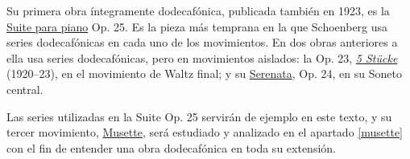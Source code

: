 Su primera obra íntegramente dodecafónica, publicada también en 1923, es la \href{https://www.youtube.com/watch?v=bQHR_Z8XVvI}{Suite para piano} Op. 25. Es la pieza más temprana en la que Schoenberg usa series dodecafónicas en cada uno de los movimientos. En dos obras anteriores a ella usa series dodecafónicas, pero en movimientos aislados: la Op. 23, \href{https://www.youtube.com/watch?v=7A9HSlgDlQE}{\emph{5 St\"ucke}} (1920--23), en el movimiento de Waltz final; y su \href{https://www.youtube.com/watch?v=fzAFalLbXxg}{Serenata}, Op. 24, en su Soneto central.

Las series utilizadas en la Suite Op. 25 servirán de ejemplo en este texto, y su tercer movimiento, \href{https://www.youtube.com/watch?v=scwNtGdop6w}{Musette}, será estudiado y analizado en el apartado \ref{musette} con el fin de entender una obra dodecafónica en toda su extensión.